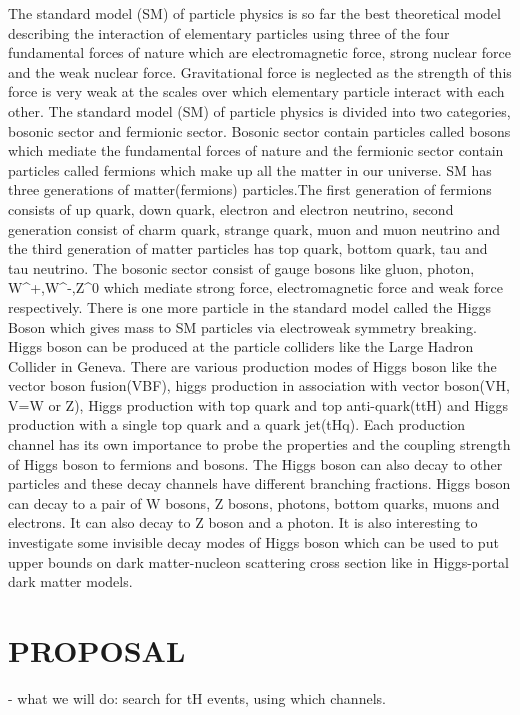 \documentclass[final,3p]{CSP}
\begin{document}
The standard model (SM) of particle physics is so far the best theoretical model describing the interaction of elementary particles using three of the four fundamental forces of nature which are electromagnetic force, strong nuclear force and the weak nuclear force. Gravitational force is neglected as the strength of this force is very weak at the scales over which elementary particle interact with each other. The standard model (SM) of particle physics is divided into two categories, bosonic sector and fermionic sector. Bosonic sector contain particles called bosons which mediate the fundamental forces of nature and the fermionic sector contain particles called fermions which make up all the matter in our universe. SM has three generations of matter(fermions) particles.The first generation of fermions consists of up quark, down quark, electron and electron neutrino, second generation consist of charm quark, strange quark, muon and muon neutrino and the third generation of matter particles has top quark, bottom quark, tau and tau neutrino. The bosonic sector consist of gauge bosons like gluon, photon, W^+,W^-,Z^0 which mediate strong force, electromagnetic force and weak force respectively. There is one more particle in the standard model called the Higgs Boson which gives mass to SM particles via electroweak symmetry breaking. Higgs boson can be produced at the particle colliders like the Large Hadron Collider in Geneva. There are various production modes of Higgs boson like the vector boson fusion(VBF), higgs production in association with vector boson(VH, V=W or Z), Higgs production with top quark and top anti-quark(ttH) and Higgs production with a single top quark and a quark jet(tHq). Each production channel has its own importance to probe the properties and the coupling strength of Higgs boson to fermions and bosons. The Higgs boson can also decay to other particles and these decay channels have different branching fractions. Higgs boson can decay to a pair of W bosons, Z bosons, photons, bottom quarks, muons and electrons. It can also decay to Z boson and a photon. It is also interesting to investigate some invisible decay modes of Higgs boson which can be used to put upper bounds on dark matter-nucleon scattering cross section like in Higgs-portal dark matter models.

\section{PROPOSAL}
- what we will do:  search for tH events, using which channels.
\end{document}
